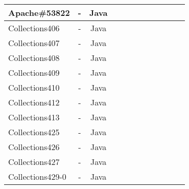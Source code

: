 \begin{table}[h!]
\begin{tabular}{lccccccccccc}
    Apache\#53822     &  -  & Java  &  &              &    &                                 &                   &                           &                    &&            \\
    \midrule
    Collections406    &  -  & Java  &  &              &    &                                 &                   &                           &                    &&           \\
    Collections407    &  -  & Java  &  &              &    &                                 &                   &                           &                    &&          \\
    Collections408    &  -  & Java  &  &              &    &                                 &                   &                           &                    &&            \\
    Collections409    &  -  & Java  &  &              &    &                                 &                   &                           &                    &&            \\
    Collections410    &  - & Java  &  &              &    &                                 &                   &                           &                     &&           \\
    Collections412    &  -  & Java  &  &              &    &                                 &                   &                           &                    &&            \\
    Collections413    &  -  & Java  &  &              &    &                                 &                   &                           &                    &&            \\
    Collections425    &  -  & Java  &  &              &    &                                 &                   &                           &                    &&            \\
    Collections426    &  -  & Java  &  &              &    &                                 &                   &                           &                    &&            \\
    Collections427    &   - & Java  &  &              &    &                                 &                   &                           &                    &&            \\
    Collections429-0    &  -  & Java  &  &              &    &                                 &                   &                           &                  &&              \\

\end{tabular}
\end{table}
